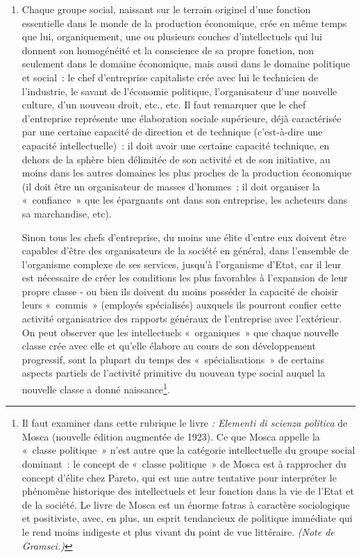 \documentclass[french,twoside]{book} %
\begin{document}
\begin{enumerate}[itemsep=\baselineskip,]
\item  Chaque groupe social, naissant sur le terrain originel d’une fonction essentielle dans le monde de la production économique, crée en même temps que lui, organiquement, une ou plusieurs couches d’intellectuels qui lui donnent son homogénéité et la conscience de sa propre fonction, non seulement dans le domaine économique, mais aussi dans le domaine politique et social : le chef d’entreprise capitaliste crée avec lui le technicien de l’industrie, le savant de l’économie politique, l’organisateur d’une nouvelle culture, d’un nouveau droit, etc., etc. Il faut remarquer que le chef d’entreprise représente une élaboration sociale supérieure, déjà caractérisée par une certaine capacité de direction et de technique (c’est-à-dire une capacité intellectuelle) : il doit avoir une certaine capacité technique, en dehors de la sphère bien délimitée de son activité et de son initiative, au moins dans les autres domaines les plus proches de la production économique (il doit être un organisateur de masses d’hommes ; il doit organiser la « confiance » que les épargnants ont dans son entreprise, les acheteurs dans sa marchandise, etc).\par
 Sinon tous les chefs d’entreprise, du moins une élite d’entre eux doivent être capables d’être des organisateurs de la société en général, dans l’ensemble de l’organisme complexe de ses services, jusqu’à l’organisme d’Etat, car il leur est nécessaire de créer les conditions les plus favorables à l’expansion de leur propre classe - ou bien ils doivent du moins posséder la capacité de choisir leurs « commis » (employés spécialisés) auxquels ils pourront confier cette activité organisatrice des rapports généraux de l’entreprise avec l’extérieur. On peut observer que les intellectuels « organiques » que chaque nouvelle classe crée avec elle et qu’elle élabore au cours de son développement progressif, sont la plupart du temps des « spécialisations » de certains aspects partiels de l’activité primitive du nouveau type social auquel la nouvelle classe a donné naissance\footnote{Il faut examiner dans cette rubrique le livre \emph{: Elementi di scienza politica} de Mosca (nouvelle édition augmentée de 1923). Ce que Mosca appelle la « classe politique » n’est autre que la catégorie intellectuelle du groupe social dominant : le concept de « classe politique » de Mosca est à rapprocher du concept d’élite chez Pareto, qui est une autre tentative pour interpréter le phénomène historique des intellectuels et leur fonction dans la vie de l’Etat et de la société. Le livre de Mosca est un énorme fatras à caractère sociologique et positiviste, avec, en plus, un esprit tendancieux de politique immédiate qui le rend moins indigeste et plus vivant du point de vue littéraire. \emph{(Note de Gramsci.)}}.\par

\end{enumerate}
\end{document}
